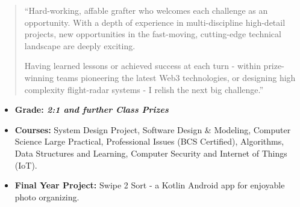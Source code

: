 \begin{quote}
``Hard-working, affable grafter who welcomes each challenge as an opportunity. With a depth of experience in multi-discipline high-detail projects, new opportunities in the fast-moving, cutting-edge technical landscape are deeply exciting. 

\smallskip
\smallskip

Having learned lessons or achieved success at each turn - within prize-winning teams pioneering the latest Web3 technologies, or designing high complexity flight-radar systems - I relish the next big challenge.''
\end{quote}

\smallskip
\smallskip
\smallskip
\smallskip

\begin{itemize}
\item \textbf{Grade: \textit{2:1 and further Class Prizes}}
\item \textbf{Courses:} System Design Project, Software Design \& Modeling, Computer Science Large Practical, Professional Issues (BCS Certified), Algorithms, Data Structures and Learning, Computer Security and Internet of Things (IoT).
\item \textbf{Final Year Project:} Swipe 2 Sort - a Kotlin Android app for enjoyable photo organizing.
\end{itemize}
\divider


{}
{}
{}
{}
{}
{}
{}
{}
{}
{}
{}
{}
\smallskip
\smallskip




